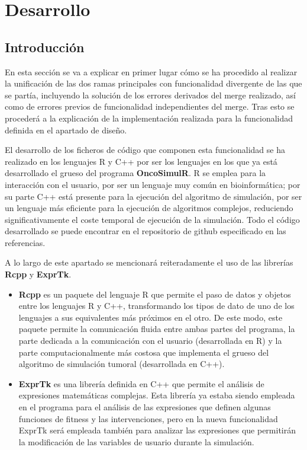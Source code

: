 \chapter{Desarrollo\label{sec:desarrollo}}\label{4}

\section{Introducción}\label{4.1}

En esta sección se va a explicar en primer lugar cómo se ha procedido al realizar la unificación de las dos ramas principales con funcionalidad divergente de las que se partía, incluyendo la solución de los errores derivados del merge realizado, así como de errores previos de funcionalidad independientes del merge. Tras esto se procederá a la explicación de la implementación realizada para la funcionalidad definida en el apartado de diseño.

El desarrollo de los ficheros de código que componen esta funcionalidad se ha realizado en los lenguajes R\cite{RProject} y C++ por ser los lenguajes en los que ya está desarrollado el grueso del programa \textbf{OncoSimulR}. R se emplea para la interacción con el usuario, por ser un lenguaje muy común en bioinformática; por su parte C++ está presente para la ejecución del algoritmo de simulación, por ser un lenguaje más eficiente para la ejecución de algoritmos complejos, reduciendo significativamente el coste temporal de ejecución de la simulación. Todo el código desarrollado se puede encontrar en el repositorio de github especificado en las referencias\cite{Repositorio}.

A lo largo de este apartado se mencionará reiteradamente el uso de las librerías \textbf{Rcpp} y \textbf{ExprTk}.
\begin{itemize}
	\item \textbf{Rcpp}\cite{Rcpp} es un paquete del lenguaje R que permite el paso de datos y objetos entre los lenguajes R y C++, transformando los tipos de dato de uno de los lenguajes a sus equivalentes más próximos en el otro. De este modo, este paquete permite la comunicación fluida entre ambas partes del programa, la parte dedicada a la comunicación con el usuario (desarrollada en R) y la parte computacionalmente más costosa que implementa el grueso del algoritmo de simulación tumoral (desarrollada en C++).
	\item \textbf{ExprTk}\cite{Exprtk} es una librería definida en C++ que permite el análisis de expresiones matemáticas complejas. Esta librería ya estaba siendo empleada en el programa para el análisis de las expresiones que definen algunas funciones de fitness y las intervenciones, pero en la nueva funcionalidad ExprTk será empleada también para analizar las expresiones que permitirán la modificación de las variables de usuario durante la simulación.
\end{itemize}

